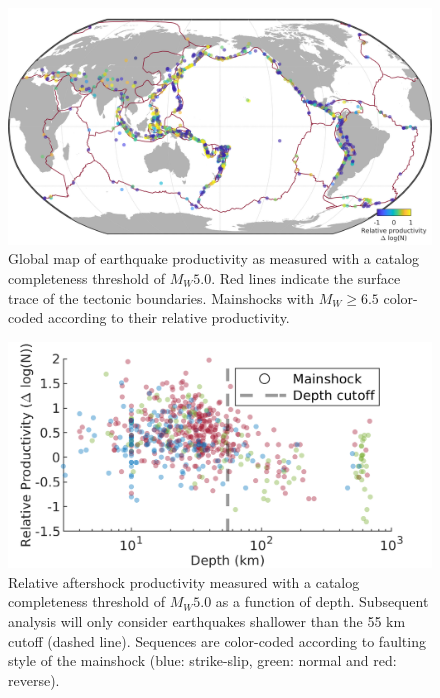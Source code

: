 \documentclass[draft]{agujournal}
\begin{document}
\begin{figure}[H]
\includegraphics[width=\linewidth]{figures/worldmap_res_mw5.png}
\caption{Global map of earthquake productivity as measured with a catalog completeness threshold of $M_W5.0$. Red lines indicate the surface trace of the tectonic boundaries. Mainshocks with $M_W\ge6.5$ color-coded according to their relative productivity.
} 
\label{fig:global_res}
\end{figure}

\begin{figure}[H]
\centering
\includegraphics{figures/prod_vs_depth_mw5.png}
\caption{Relative aftershock productivity measured with a catalog completeness threshold of $M_W5.0$ as a function of depth. Subsequent analysis will only consider earthquakes shallower than the 55 km cutoff (dashed line). Sequences are color-coded according to faulting style of the mainshock (blue: strike-slip, green: normal and red: reverse).}
\label{fig:prod_vs_depth}
\end{figure}
\end{document}
